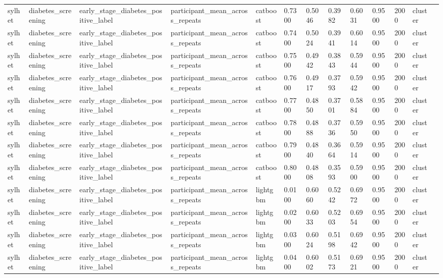 \begin{tabular}{lllllllllllll}
sylhet & diabetes\_screening & early\_stage\_diabetes\_positive\_label & participant\_mean\_across\_repeats & catboost & 0.7300 & 0.5046 & 0.3982 & 0.6031 & 0.9500 & 2000 & cluster &  \\
sylhet & diabetes\_screening & early\_stage\_diabetes\_positive\_label & participant\_mean\_across\_repeats & catboost & 0.7400 & 0.5024 & 0.3941 & 0.6014 & 0.9500 & 2000 & cluster &  \\
sylhet & diabetes\_screening & early\_stage\_diabetes\_positive\_label & participant\_mean\_across\_repeats & catboost & 0.7500 & 0.4942 & 0.3843 & 0.5944 & 0.9500 & 2000 & cluster &  \\
sylhet & diabetes\_screening & early\_stage\_diabetes\_positive\_label & participant\_mean\_across\_repeats & catboost & 0.7600 & 0.4917 & 0.3793 & 0.5942 & 0.9500 & 2000 & cluster &  \\
sylhet & diabetes\_screening & early\_stage\_diabetes\_positive\_label & participant\_mean\_across\_repeats & catboost & 0.7700 & 0.4850 & 0.3701 & 0.5884 & 0.9500 & 2000 & cluster &  \\
sylhet & diabetes\_screening & early\_stage\_diabetes\_positive\_label & participant\_mean\_across\_repeats & catboost & 0.7800 & 0.4888 & 0.3736 & 0.5950 & 0.9500 & 2000 & cluster &  \\
sylhet & diabetes\_screening & early\_stage\_diabetes\_positive\_label & participant\_mean\_across\_repeats & catboost & 0.7900 & 0.4840 & 0.3664 & 0.5914 & 0.9500 & 2000 & cluster &  \\
sylhet & diabetes\_screening & early\_stage\_diabetes\_positive\_label & participant\_mean\_across\_repeats & catboost & 0.8000 & 0.4808 & 0.3593 & 0.5900 & 0.9500 & 2000 & cluster &  \\
sylhet & diabetes\_screening & early\_stage\_diabetes\_positive\_label & participant\_mean\_across\_repeats & lightgbm & 0.0100 & 0.6060 & 0.5242 & 0.6972 & 0.9500 & 2000 & cluster &  \\
sylhet & diabetes\_screening & early\_stage\_diabetes\_positive\_label & participant\_mean\_across\_repeats & lightgbm & 0.0200 & 0.6033 & 0.5203 & 0.6954 & 0.9500 & 2000 & cluster &  \\
sylhet & diabetes\_screening & early\_stage\_diabetes\_positive\_label & participant\_mean\_across\_repeats & lightgbm & 0.0300 & 0.6024 & 0.5198 & 0.6942 & 0.9500 & 2000 & cluster &  \\
sylhet & diabetes\_screening & early\_stage\_diabetes\_positive\_label & participant\_mean\_across\_repeats & lightgbm & 0.0400 & 0.6002 & 0.5173 & 0.6921 & 0.9500 & 2000 & cluster &  \\

\end{tabular}
